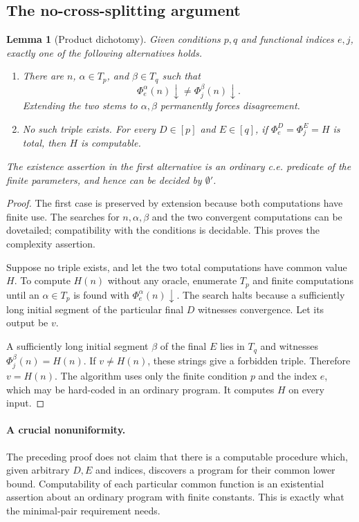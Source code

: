 \documentclass[11pt,a4paper]{article}
\newtheorem{lemma}[theorem]{Lemma}
\theoremstyle{definition}\newtheorem{definition}[theorem]{Definition}
\theoremstyle{remark}\newtheorem{remark}[theorem]{Remark}
\begin{document}
\subsection{The no-cross-splitting argument}
\begin{lemma}[Product dichotomy]\label{lem:product}
Given conditions $p,q$ and functional indices $e,j$, exactly one of the following alternatives holds.
\begin{enumerate}
\item There are $n$, $\alpha\in T_p$, and $\beta\in T_q$ such that
\[
 \Phi_e^\alpha(n)\downarrow\ne\Phi_j^\beta(n)\downarrow.
 \tag{$*$}\label{eq:cross}
\]
Extending the two stems to $\alpha,\beta$ permanently forces disagreement.
\item No such triple exists. For every $D\in[p]$ and $E\in[q]$, if
$\Phi_e^D=\Phi_j^E=H$ is total, then $H$ is computable.
\end{enumerate}
The existence assertion in the first alternative is an ordinary c.e. predicate of the finite parameters, and hence can be decided by $\emptyset'$.
\end{lemma}
\begin{proof}
The first case is preserved by extension because both computations have finite use. The searches for $n,\alpha,\beta$ and the two convergent computations can be dovetailed; compatibility with the conditions is decidable. This proves the complexity assertion.

Suppose no triple exists, and let the two total computations have common value $H$. To compute $H(n)$ without any oracle, enumerate $T_p$ and finite computations until an $\alpha\in T_p$ is found with $\Phi_e^\alpha(n)\downarrow$. The search halts because a sufficiently long initial segment of the particular final $D$ witnesses convergence. Let its output be $v$.

A sufficiently long initial segment $\beta$ of the final $E$ lies in $T_q$ and witnesses $\Phi_j^\beta(n)=H(n)$. If $v\ne H(n)$, these strings give a forbidden triple. Therefore $v=H(n)$. The algorithm uses only the finite condition $p$ and the index $e$, which may be hard-coded in an ordinary program. It computes $H$ on every input.
\end{proof}

\paragraph{A crucial nonuniformity.}
The preceding proof does not claim that there is a computable procedure which, given arbitrary $D,E$ and indices, discovers a program for their common lower bound. Computability of each particular common function is an existential assertion about an ordinary program with finite constants. This is exactly what the minimal-pair requirement needs.
\end{document}
